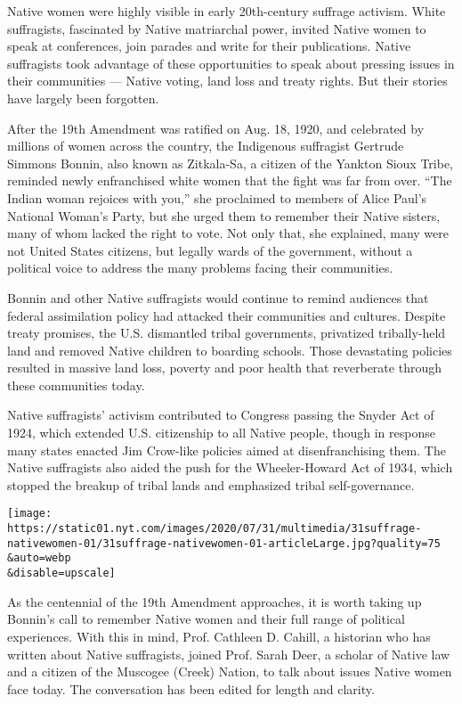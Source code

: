 Native women were highly visible in early 20th-century suffrage
activism. White suffragists, fascinated by Native matriarchal power,
invited Native women to speak at conferences, join parades and write for
their publications. Native suffragists took advantage of these
opportunities to speak about pressing issues in their communities ---
Native voting, land loss and treaty rights. But their stories have
largely been forgotten.

After the 19th Amendment was ratified on Aug. 18, 1920, and celebrated
by millions of women across the country, the Indigenous suffragist
Gertrude Simmons Bonnin, also known as Zitkala-Sa, a citizen of the
Yankton Sioux Tribe, reminded newly enfranchised white women that the
fight was far from over. ``The Indian woman rejoices with you,'' she
proclaimed to members of Alice Paul's National Woman's Party, but she
urged them to remember their Native sisters, many of whom lacked the
right to vote. Not only that, she explained, many were not United States
citizens, but legally wards of the government, without a political voice
to address the many problems facing their communities.

Bonnin and other Native suffragists would continue to remind audiences
that federal assimilation policy had attacked their communities and
cultures. Despite treaty promises, the U.S. dismantled tribal
governments, privatized tribally-held land and removed Native children
to boarding schools. Those devastating policies resulted in massive land
loss, poverty and poor health that reverberate through these communities
today.

Native suffragists' activism contributed to Congress passing the Snyder
Act of 1924, which extended U.S. citizenship to all Native people,
though in response many states enacted Jim Crow-like policies aimed at
disenfranchising them. The Native suffragists also aided the push for
the Wheeler-Howard Act of 1934, which stopped the breakup of tribal
lands and emphasized tribal self-governance.

\texttt{[image: https://static01.nyt.com/images/2020/07/31/multimedia/31suffrage-nativewomen-01/31suffrage-nativewomen-01-articleLarge.jpg?quality=75\\\&auto=webp\\\&disable=upscale]}

As the centennial of the 19th Amendment approaches, it is worth taking
up Bonnin's call to remember Native women and their full range of
political experiences. With this in mind, Prof. Cathleen D. Cahill, a
historian who has written about Native suffragists, joined Prof. Sarah
Deer, a scholar of Native law and a citizen of the Muscogee (Creek)
Nation, to talk about issues Native women face today. The conversation
has been edited for length and clarity.

